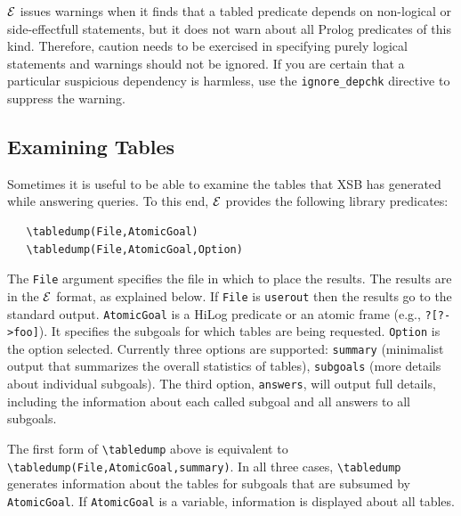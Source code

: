 \documentclass[11pt]{article}
\newcommand{\ERGO}{\mbox{\ensuremath{\cal{E}}\smaller{{\sc{RGO}}}}\xspace}
\newcommand{\FLSYSTEM}{\ERGO}
\newcommand{\bs}{\textbackslash}
\begin{document}
\FLSYSTEM issues warnings when it finds that a tabled predicate depends on
non-logical or side-effectfull statements, but it does not warn about all
Prolog predicates of this kind. Therefore, caution needs to be exercised in
specifying purely logical statements and warnings should not be ignored.
If you are certain that a particular suspicious dependency
is harmless, use the {\tt ignore\_depchk} directive to suppress the warning.


\subsection{Examining Tables}\label{sec-tabledump}

Sometimes it is useful to be able to examine the tables that XSB has
generated while answering queries. To this end, \FLSYSTEM provides 
the following library predicates:
\index{\bs{}tabledump}
\begin{verbatim}
   \tabledump(File,AtomicGoal)
   \tabledump(File,AtomicGoal,Option)
\end{verbatim}
The \texttt{File} argument specifies the file in which to place the results.
The results are in the \FLSYSTEM format, as explained below.
If \texttt{File} is \texttt{userout} then the results go to the standard
output.  \texttt{AtomicGoal} is a HiLog predicate or an atomic frame
(e.g., \texttt{?[?->foo]}).
It specifies the subgoals for which tables are
being requested.
\texttt{Option} is the option selected. Currently three options are
supported:
\texttt{summary} (minimalist output that summarizes the overall statistics
of tables), \texttt{subgoals} (more details about individual subgoals). The
third option, \texttt{answers},
will output full details, including the information about each called subgoal
and all answers to all
subgoals.

The first form of \texttt{\bs{}tabledump}  above is equivalent to
\texttt{\bs{}tabledump(File,AtomicGoal,summary)}. 
In all three cases, \texttt{\bs{}tabledump} generates information
about the tables for subgoals that are subsumed by \texttt{AtomicGoal}. If
\texttt{AtomicGoal} is a variable, information is displayed about all
tables.   
\end{document}
